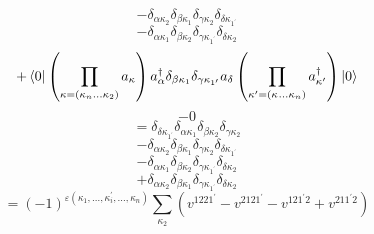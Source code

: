 \documentclass[12pt]{article}
\begin{document}
\begin{equation}
    -\delta _{\alpha  \kappa _{2}}\delta _{\beta  \kappa _{1}}\delta _{\gamma  \kappa _{2}}\delta _{\delta  \kappa _{1^{\prime}}}
\end{equation}
\begin{equation}
    -\delta _{\alpha  \kappa _{1}}\delta _{\beta  \kappa _{2}}\delta _{\gamma  \kappa _{1^{\prime}}}\delta _{\delta  \kappa _{2}}
\end{equation}
\begin{equation}
    +\bra{0}\left(\prod_{\kappa=\left(\kappa_{n}\dots\kappa_{2}\right)}a_{\kappa}\right)
        a^{\dag}_{\alpha }\delta _{\beta  \kappa _{1}}\delta _{\gamma  \kappa _{1^{\prime}}}a_{\delta }
    \left(\prod_{\kappa^{\prime}=\left(\kappa_{}\dots\kappa_{n}\right)}a^{\dag}_{\kappa^{\prime}}\right)\ket{0}
\end{equation}
\begin{equation}
    -0
\end{equation}
\begin{equation}
    =\delta _{\delta  \kappa _{1^{\prime}}}\delta _{\alpha  \kappa _{1}}\delta _{\beta  \kappa _{2}}\delta _{\gamma  \kappa _{2}}
\end{equation}
\begin{equation}
    -\delta _{\alpha  \kappa _{2}}\delta _{\beta  \kappa _{1}}\delta _{\gamma  \kappa _{2}}\delta _{\delta  \kappa _{1^{\prime}}}
\end{equation}
\begin{equation}
    -\delta _{\alpha  \kappa _{1}}\delta _{\beta  \kappa _{2}}\delta _{\gamma  \kappa _{1^{\prime}}}\delta _{\delta  \kappa _{2}}
\end{equation}
\begin{equation}
    +\delta _{\alpha  \kappa _{2}}\delta _{\beta  \kappa _{1}}\delta _{\gamma  \kappa _{1^{\prime}}}\delta _{\delta  \kappa _{2}}
\end{equation}
\begin{equation}
    =\left(-1\right)^{\varepsilon\left(\kappa_{1},\dots,\kappa_{i}^{\prime},\dots,\kappa_{n}\right)}\sum_{\kappa _{2}} \left(v^{1221^{\prime}}-v^{2121^{\prime}}-v^{121^{\prime}2}+v^{211^{\prime}2}\right)
\end{equation}
\end{document}
